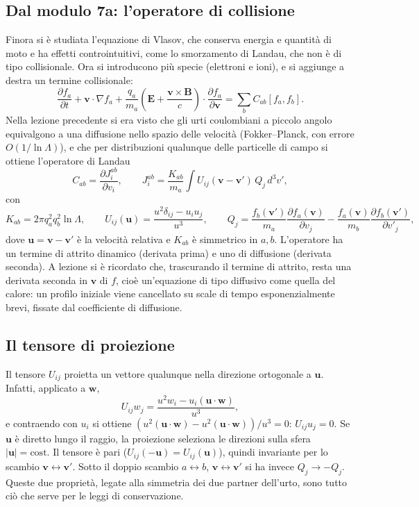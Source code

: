 \subsection{Dal modulo 7a: l'operatore di collisione}
Finora si è studiata l'equazione di Vlasov, che conserva energia e quantità di moto e ha effetti controintuitivi, come lo smorzamento di Landau, che non è di tipo collisionale. Ora si introducono più specie (elettroni e ioni), e si aggiunge a destra un termine collisionale:
\begin{equation}
\frac{\partial f_a}{\partial t}+\mathbf{v}\cdot\nabla f_a+\frac{q_a}{m_a}\left(\mathbf{E}+\frac{\mathbf{v}\times\mathbf{B}}{c}\right)\cdot\frac{\partial f_a}{\partial\mathbf{v}}=\sum_bC_{ab}[f_a,f_b].
\end{equation}
Nella lezione precedente si era visto che gli urti coulombiani a piccolo angolo equivalgono a una diffusione nello spazio delle velocità (Fokker--Planck, con errore $O(1/\ln\Lambda)$), e che per distribuzioni qualunque delle particelle di campo si ottiene l'operatore di Landau
\begin{equation}
C_{ab}=\frac{\partial J^{ab}_i}{\partial v_i},\qquad J^{ab}_i=\frac{K_{ab}}{m_a}\int U_{ij}(\mathbf{v}-\mathbf{v}')\,Q_j\,d^3v',
\end{equation}
con
\begin{equation}
K_{ab}=2\pi q_a^2q_b^2\ln\Lambda,\qquad U_{ij}(\mathbf{u})=\frac{u^2\delta_{ij}-u_iu_j}{u^3},\qquad Q_j=\frac{f_b(\mathbf{v}')}{m_a}\frac{\partial f_a(\mathbf{v})}{\partial v_j}-\frac{f_a(\mathbf{v})}{m_b}\frac{\partial f_b(\mathbf{v}')}{\partial v'_j},
\end{equation}
dove $\mathbf{u}=\mathbf{v}-\mathbf{v}'$ è la velocità relativa e $K_{ab}$ è simmetrico in $a,b$. L'operatore ha un termine di attrito dinamico (derivata prima) e uno di diffusione (derivata seconda). A lezione si è ricordato che, trascurando il termine di attrito, resta una derivata seconda in $\mathbf{v}$ di $f$, cioè un'equazione di tipo diffusivo come quella del calore: un profilo iniziale viene cancellato su scale di tempo esponenzialmente brevi, fissate dal coefficiente di diffusione.

\subsection{Il tensore di proiezione}
Il tensore $U_{ij}$ proietta un vettore qualunque nella direzione ortogonale a $\mathbf{u}$. Infatti, applicato a $\mathbf{w}$,
\begin{equation}
U_{ij}w_j=\frac{u^2w_i-u_i(\mathbf{u}\cdot\mathbf{w})}{u^3},
\end{equation}
e contraendo con $u_i$ si ottiene $(u^2(\mathbf{u}\cdot\mathbf{w})-u^2(\mathbf{u}\cdot\mathbf{w}))/u^3=0$: $U_{ij}u_j=0$. Se $\mathbf{u}$ è diretto lungo il raggio, la proiezione seleziona le direzioni sulla sfera $|\mathbf{u}|=\mathrm{cost}$. Il tensore è pari ($U_{ij}(-\mathbf{u})=U_{ij}(\mathbf{u})$), quindi invariante per lo scambio $\mathbf{v}\leftrightarrow\mathbf{v}'$. Sotto il doppio scambio $a\leftrightarrow b$, $\mathbf{v}\leftrightarrow\mathbf{v}'$ si ha invece $Q_j\to-Q_j$. Queste due proprietà, legate alla simmetria dei due partner dell'urto, sono tutto ciò che serve per le leggi di conservazione.

